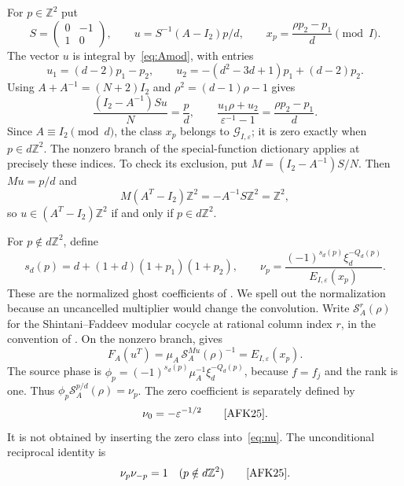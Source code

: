 \documentclass[11pt]{article}
\newcommand{\Z}{\mathbb Z}
\newcommand{\SF}{\mathcal S}
\begin{document}
For $p\in\Z^2$ put
\begin{equation}
\label{eq:coordinates}
 S=\begin{pmatrix}0&-1\\1&0\end{pmatrix},\qquad
 u=S^{-1}(A-I_2)p/d,\qquad x_p=\frac{\rho p_2-p_1}{d}\pmod I.
\end{equation}
The vector $u$ is integral by~\eqref{eq:Amod}, with entries
\[
 u_1=(d-2)p_1-p_2,\qquad
 u_2=-(d^2-3d+1)p_1+(d-2)p_2.
\]
Using $A+A^{-1}=(N+2)I_2$ and $\rho^2=(d-1)\rho-1$ gives
\begin{equation}
\label{eq:dictionary-coordinate}
 \frac{(I_2-A^{-1})Su}{N}=\frac pd,\qquad
 \frac{u_1\rho+u_2}{\varepsilon^{-1}-1}=\frac{\rho p_2-p_1}{d}.
\end{equation}
Since $A\equiv I_2\pmod d$, the class $x_p$ belongs to
$\mathcal G_{I,\varepsilon}$; it is zero exactly when $p\in d\Z^2$.
The nonzero branch of the special-function dictionary applies at precisely
these indices. To check its exclusion, put $M=(I_2-A^{-1})S/N$.
Then $Mu=p/d$ and
\[
 M(A^T-I_2)\Z^2=-A^{-1}S\Z^2=\Z^2,
\]
so $u\in(A^T-I_2)\Z^2$ if and only if $p\in d\Z^2$.

For $p\notin d\Z^2$, define
\begin{equation}
\label{eq:nu}
 s_d(p)=d+(1+d)(1+p_1)(1+p_2),\qquad
 \nu_p=\frac{(-1)^{s_d(p)}\xi_d^{-Q_d(p)}}{E_{I,\varepsilon}(x_p)}.
\end{equation}
These are the normalized ghost coefficients of \cite{AFK25}. We spell out
the normalization because an uncancelled multiplier would change the
convolution. Write $\SF_A^r(\rho)$ for the Shintani--Faddeev modular cocycle
at rational column index $r$, in the convention of \cite{AFK25}. On the
nonzero branch, \cite[Proposition~2.1]{AFK26} gives
\begin{equation}
\label{eq:dictionary}
 F_A(u^T)=\mu_A\,\SF_A^{Mu}(\rho)^{-1}
          =E_{I,\varepsilon}(x_p).
\end{equation}
The source phase is
$\phi_p=(-1)^{s_d(p)}\mu_A^{-1}\xi_d^{-Q_d(p)}$, because $f=f_j$ and the
rank is one. Thus $\phi_p\SF_A^{p/d}(\rho)=\nu_p$.
The zero coefficient is separately defined by
\begin{equation}
\label{eq:zero}
 \nu_0=-\varepsilon^{-1/2}
 \qquad\text{{\cite[Equation~(5.65)]{AFK25}}}.
\end{equation}
It is not obtained by inserting the zero class into~\eqref{eq:nu}.
The unconditional reciprocal identity is
\begin{equation}
\label{eq:reciprocal}
 \nu_p\nu_{-p}=1\quad(p\notin d\Z^2)
 \qquad\text{{\cite[Theorem~5.8]{AFK25}}}.
\end{equation}
\end{document}
